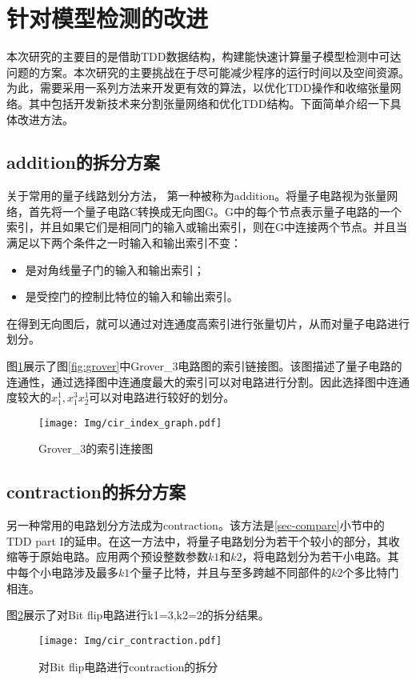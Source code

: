 \section{针对模型检测的改进}
本次研究的主要目的是借助TDD数据结构，构建能快速计算量子模型检测中可达问题的方案。本次研究的主要挑战在于尽可能减少程序的运行时间以及空间资源。为此，需要采用一系列方法来开发更有效的算法，以优化TDD操作和收缩张量网络。其中包括开发新技术来分割张量网络和优化TDD结构。下面简单介绍一下具体改进方法。

\subsection*{addition的拆分方案}
\label{addition}关于常用的量子线路划分方法，
第一种被称为addition\citep{chen2018classical}。将量子电路视为张量网络，首先将一个量子电路C转换成无向图G。G中的每个节点表示量子电路的一个索引，并且如果它们是相同门的输入或输出索引，则在G中连接两个节点。并且当满足以下两个条件之一时输入和输出索引不变：
\begin{itemize}
	\item 是对角线量子门的输入和输出索引；
	\item 是受控门的控制比特位的输入和输出索引。
\end{itemize}
在得到无向图后，就可以通过对连通度高索引进行张量切片，从而对量子电路进行划分。 
\begin{example}
    图\ref{fig:addition}展示了图\ref{fig:grover}中Grover\_3电路图的索引链接图。该图描述了量子电路的连通性，通过选择图中连通度最大的索引可以对电路进行分割。因此选择图中连通度较大的$x_1^1,x_1^3x_2^1$可以对电路进行较好的划分。
 
\begin{figure}[!htbp]
	\centering
	\texttt{[image: Img/cir\_index\_graph.pdf]}
	\caption{Grover\_3的索引连接图}
	\label{fig:addition}
\end{figure} 
\end{example}

\subsection*{contraction的拆分方案}
另一种常用的电路划分方法成为contraction。该方法是\ref{sec-compare}小节中的TDD part I的延申。在这一方法中，将量子电路划分为若干个较小的部分，其收缩等于原始电路。应用两个预设整数参数$k1$和$k2$，将电路划分为若干小电路。其中每个小电路涉及最多$k1$个量子比特，并且与至多跨越不同部件的$k2$个多比特门相连。
\begin{example}
    图\ref{fig:contraction}展示了对Bit flip电路进行k1=3,k2=2的拆分结果。
\begin{figure}[!htbp]
	\centering
	\texttt{[image: Img/cir\_contraction.pdf]}
	\caption{对Bit flip电路进行contraction的拆分}
	\label{fig:contraction}
\end{figure} 
\end{example}


